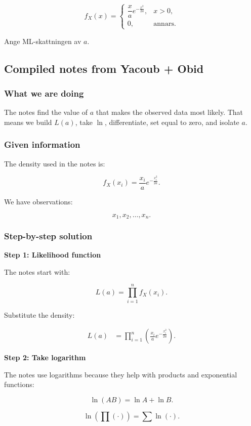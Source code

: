 \documentclass[10pt]{article}
\begin{document}
\[
f_X(x)=
\begin{cases}
\dfrac{x}{a}e^{-\frac{x^2}{2a}},
& x>0,\\[2mm]
0, & \text{annars.}
\end{cases}
\]

Ange ML-skattningen av \(a\).

\subsection*{Compiled notes from Yacoub + Obid}

\subsubsection*{What we are doing}
The notes find the value of \(a\) that makes the
observed data most likely.
That means we build \(L(a)\), take \(\ln\),
differentiate, set equal to zero,
and isolate \(a\).

\subsubsection*{Given information}
The density used in the notes is:

\[
f_X(x_i)
=
\frac{x_i}{a}
e^{-\frac{x_i^2}{2a}}.
\]

We have observations:

\[
x_1,x_2,\ldots,x_n.
\]

\subsubsection*{Step-by-step solution}

\textbf{Step 1: Likelihood function}

The notes start with:

\[
L(a)=
\prod_{i=1}^{n} f_X(x_i).
\]

Substitute the density:

\begin{align*}
L(a)
&=
\prod_{i=1}^{n}
\left(
\frac{x_i}{a}
e^{-\frac{x_i^2}{2a}}
\right).
\end{align*}

\textbf{Step 2: Take logarithm}

The notes use logarithms because they help with
products and exponential functions:

\[
\ln(AB)=\ln A+\ln B.
\]

\[
\ln\left(\prod(\cdot)\right)
=
\sum \ln(\cdot).
\]
\end{document}
